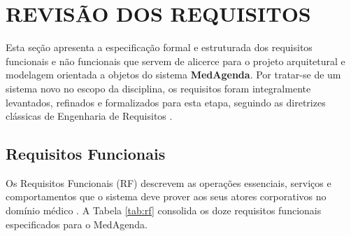 \section{REVISÃO DOS REQUISITOS}

Esta seção apresenta a especificação formal e estruturada dos requisitos funcionais e não funcionais que servem de alicerce para o projeto arquitetural e modelagem orientada a objetos do sistema \textbf{MedAgenda}. Por tratar-se de um sistema novo no escopo da disciplina, os requisitos foram integralmente levantados, refinados e formalizados para esta etapa, seguindo as diretrizes clássicas de Engenharia de Requisitos \cite{sommerville2011, pressman2016}.

\subsection{Requisitos Funcionais}

Os Requisitos Funcionais (RF) descrevem as operações essenciais, serviços e comportamentos que o sistema deve prover aos seus atores corporativos no domínio médico \cite{larman2004}. A Tabela \ref{tab:rf} consolida os doze requisitos funcionais especificados para o MedAgenda.

